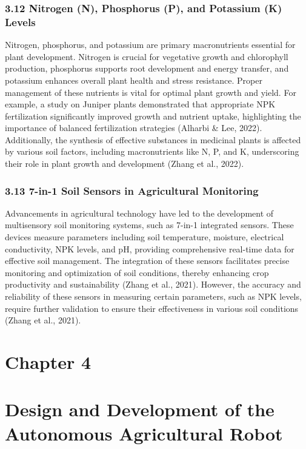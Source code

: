 \documentclass{book} %
\begin{document}
\noindent 
\subsection{3.12 Nitrogen (N), Phosphorus (P), and Potassium (K) Levels}

\noindent Nitrogen, phosphorus, and potassium are primary macronutrients essential for plant development. Nitrogen is crucial for vegetative growth and chlorophyll production, phosphorus supports root development and energy transfer, and potassium enhances overall plant health and stress resistance. Proper management of these nutrients is vital for optimal plant growth and yield. For example, a study on Juniper plants demonstrated that appropriate NPK fertilization significantly improved growth and nutrient uptake, highlighting the importance of balanced fertilization strategies (Alharbi \& Lee, 2022). Additionally, the synthesis of effective substances in medicinal plants is affected by various soil factors, including macronutrients like N, P, and K, underscoring their role in plant growth and development (Zhang et al., 2022).

\noindent 
\subsection{3.13 7-in-1 Soil Sensors in Agricultural Monitoring}

\noindent Advancements in agricultural technology have led to the development of multisensory soil monitoring systems, such as 7-in-1 integrated sensors. These devices measure parameters including soil temperature, moisture, electrical conductivity, NPK levels, and pH, providing comprehensive real-time data for effective soil management. The integration of these sensors facilitates precise monitoring and optimization of soil conditions, thereby enhancing crop productivity and sustainability (Zhang et al., 2021). However, the accuracy and reliability of these sensors in measuring certain parameters, such as NPK levels, require further validation to ensure their effectiveness in various soil conditions (Zhang et al., 2021).

\noindent \eject 

\noindent 
\chapter{Chapter 4}

\noindent 
\chapter{Design and Development of the Autonomous Agricultural Robot}
\end{document}
